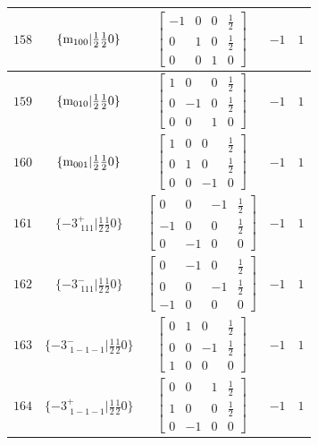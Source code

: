\documentclass[fleqn,8pt]{jsarticle}
\begin{document}
\begin{longtable}{ccccc}
$ 158 $ & $ \{{\rm m}_{100}|\frac{1}{2} \frac{1}{2} 0\} $ & $ \begin{bmatrix} -1 & 0 & 0 & \frac{1}{2} \\ 0 & 1 & 0 & \frac{1}{2} \\ 0 & 0 & 1 & 0 \end{bmatrix} $ & $ -1 $ & $ 1 $ \\ \hline
$ 159 $ & $ \{{\rm m}_{010}|\frac{1}{2} \frac{1}{2} 0\} $ & $ \begin{bmatrix} 1 & 0 & 0 & \frac{1}{2} \\ 0 & -1 & 0 & \frac{1}{2} \\ 0 & 0 & 1 & 0 \end{bmatrix} $ & $ -1 $ & $ 1 $ \\ \hline
$ 160 $ & $ \{{\rm m}_{001}|\frac{1}{2} \frac{1}{2} 0\} $ & $ \begin{bmatrix} 1 & 0 & 0 & \frac{1}{2} \\ 0 & 1 & 0 & \frac{1}{2} \\ 0 & 0 & -1 & 0 \end{bmatrix} $ & $ -1 $ & $ 1 $ \\ \hline
$ 161 $ & $ \{-3^{+}_{\,\,111}|\frac{1}{2} \frac{1}{2} 0\} $ & $ \begin{bmatrix} 0 & 0 & -1 & \frac{1}{2} \\ -1 & 0 & 0 & \frac{1}{2} \\ 0 & -1 & 0 & 0 \end{bmatrix} $ & $ -1 $ & $ 1 $ \\ \hline
$ 162 $ & $ \{-3^{-}_{\,\,111}|\frac{1}{2} \frac{1}{2} 0\} $ & $ \begin{bmatrix} 0 & -1 & 0 & \frac{1}{2} \\ 0 & 0 & -1 & \frac{1}{2} \\ -1 & 0 & 0 & 0 \end{bmatrix} $ & $ -1 $ & $ 1 $ \\ \hline
$ 163 $ & $ \{-3^{-}_{\,\,1-1-1}|\frac{1}{2} \frac{1}{2} 0\} $ & $ \begin{bmatrix} 0 & 1 & 0 & \frac{1}{2} \\ 0 & 0 & -1 & \frac{1}{2} \\ 1 & 0 & 0 & 0 \end{bmatrix} $ & $ -1 $ & $ 1 $ \\ \hline
$ 164 $ & $ \{-3^{+}_{\,\,1-1-1}|\frac{1}{2} \frac{1}{2} 0\} $ & $ \begin{bmatrix} 0 & 0 & 1 & \frac{1}{2} \\ 1 & 0 & 0 & \frac{1}{2} \\ 0 & -1 & 0 & 0 \end{bmatrix} $ & $ -1 $ & $ 1 $ \\ \hline

\end{longtable}
\end{document}
